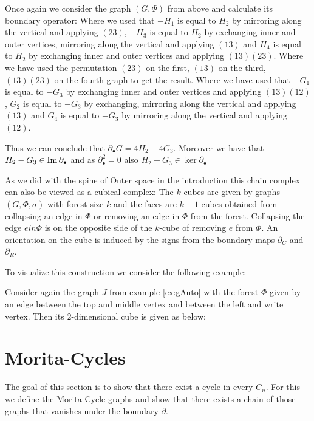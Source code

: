 \begin{eg}
	Once again we consider the graph $(G,\Phi)$ from above and calculate its boundary operator:
	Where we used that $-H_{1}$ is equal to $H_{2}$ by mirroring along the vertical and applying $(2 3)$,
	$-H_{3}$ is equal to $H_2$ by exchanging inner and outer vertices, mirroring along the vertical and applying $(1 3)$ and
	$H_{4}$ is equal to $H_{2}$ by exchanging inner and outer vertices and applying $(1 3)(2 3)$.
	Where we have used the permutation $(2 3)$ on the first,  $(1 3)$ on the third, $(1 3)(2 3)$ on the fourth graph to get the result.
	Where we have used that $-G_{1}$ is equal to $-G_{3}$ by exchanging inner and outer vertices and applying $(1 3)(1 2)$,
	$G_{2}$ is equal to $-G_{3}$ by exchanging, mirroring along the vertical and applying $(1 3)$ and
	$G_{4}$ is equal to $-G_{3}$ by mirroring along the vertical and applying $(1 2)$. 

	Thus we can conclude that $\partial_{\bullet} G = 4 H_2 - 4 G_3$. Moreover we have that $H_2 - G_3 \in \operatorname{Im} \partial_{\bullet}$ and 
	as $\partial_{\bullet}^2=0$ also $H_2 - G_3 \in \ker \partial_{\bullet}$
\end{eg}

As we did with the spine of Outer space in the introduction this chain complex
can also be viewed as a cubical complex: The $k$-cubes are given by graphs $(G,\Phi,\sigma)$
with forest size $k$ and the faces are $k-1$-cubes obtained from collapsing an edge in $\Phi$ 
or removing an edge in $\Phi$ from the forest. Collapsing the edge $e in \Phi$ is
on the opposite side of the $k$-cube of removing $e$ from $\Phi$. 
An orientation on the cube is induced by the signs from the boundary maps $\partial_{C}$ and $\partial_{R}$.

To visualize this construction we consider the following example:
\begin{eg}
	Consider again the graph $J$ from example \ref{ex:gAuto} with the forest $\Phi$ given by an edge between the top and middle vertex and
	between the left and write vertex.
	Then its $2$-dimensional cube is given as below:
\end{eg}
\newpage
\section{Morita-Cycles}
The goal of this section is to show that there exist a cycle in every $C_{n}$.
For this we define the Morita-Cycle graphs and show that there exists a chain of those graphs that vanishes under the boundary $\partial$.

